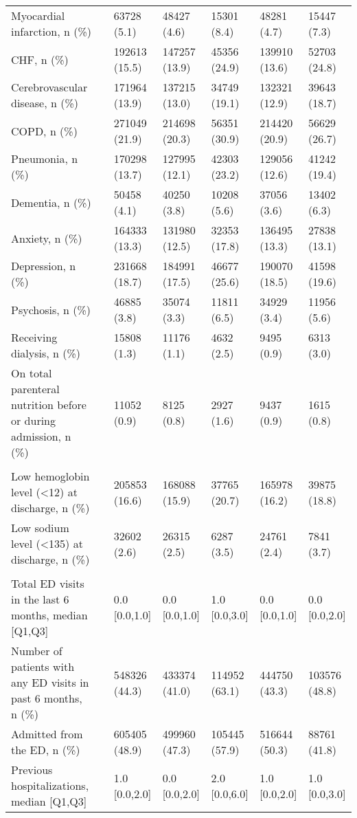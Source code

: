 \begin{adjustbox}{width={\textwidth},totalheight={\textheight},keepaspectratio,frame}
{\begin{tabular}{L{20em}C{10em}C{10em}C{10em}C{10em}C{10em}}
Myocardial infarction, n (\%) &  & 63728 (5.1) & 48427 (4.6) & 15301 (8.4) & 48281 (4.7) & 15447 (7.3)\\
CHF, n (\%) &  & 192613 (15.5) & 147257 (13.9) & 45356 (24.9) & 139910 (13.6) & 52703 (24.8)\\
Cerebrovascular disease, n (\%) &  & 171964 (13.9) & 137215 (13.0) & 34749 (19.1) & 132321 (12.9) & 39643 (18.7)\\
COPD, n (\%) &  & 271049 (21.9) & 214698 (20.3) & 56351 (30.9) & 214420 (20.9) & 56629 (26.7)\\
Pneumonia, n (\%) &  & 170298 (13.7) & 127995 (12.1) & 42303 (23.2) & 129056 (12.6) & 41242 (19.4)\\
Dementia, n (\%) &  & 50458 (4.1) & 40250 (3.8) & 10208 (5.6) & 37056 (3.6) & 13402 (6.3)\\
Anxiety, n (\%) &  & 164333 (13.3) & 131980 (12.5) & 32353 (17.8) & 136495 (13.3) & 27838 (13.1)\\
Depression, n (\%) &  & 231668 (18.7) & 184991 (17.5) & 46677 (25.6) & 190070 (18.5) & 41598 (19.6)\\
Psychosis, n (\%) &  & 46885 (3.8) & 35074 (3.3) & 11811 (6.5) & 34929 (3.4) & 11956 (5.6)\\
Receiving dialysis, n (\%) &  & 15808 (1.3) & 11176 (1.1) & 4632 (2.5) & 9495 (0.9) & 6313 (3.0)\\
On total parenteral nutrition before or during admission, n (\%) &  & 11052 (0.9) & 8125 (0.8) & 2927 (1.6) & 9437 (0.9) & 1615 (0.8)\\
 &  &  &  &  &  & \\
Low hemoglobin level (<12) at discharge, n (\%) &  & 205853 (16.6) & 168088 (15.9) & 37765 (20.7) & 165978 (16.2) & 39875 (18.8)\\
Low sodium level (<135) at discharge, n (\%) &  & 32602 (2.6) & 26315 (2.5) & 6287 (3.5) & 24761 (2.4) & 7841 (3.7)\\
 &  &  &  &  &  & \\
Total ED visits in the last 6 months, median [Q1,Q3] &  & 0.0 [0.0,1.0] & 0.0 [0.0,1.0] & 1.0 [0.0,3.0] & 0.0 [0.0,1.0] & 0.0 [0.0,2.0]\\
Number of patients with any ED visits in past 6 months, n (\%) &  & 548326 (44.3) & 433374 (41.0) & 114952 (63.1) & 444750 (43.3) & 103576 (48.8)\\
Admitted from the ED, n (\%) &  & 605405 (48.9) & 499960 (47.3) & 105445 (57.9) & 516644 (50.3) & 88761 (41.8)\\
Previous hospitalizations, median [Q1,Q3] &  & 1.0 [0.0,2.0] & 0.0 [0.0,2.0] & 2.0 [0.0,6.0] & 1.0 [0.0,2.0] & 1.0 [0.0,3.0]\\

\end{tabular}}
\end{adjustbox}
